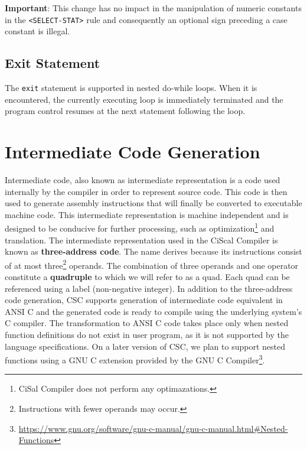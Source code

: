 \documentclass{article}
\def\code#1{\texttt{#1}} %
\begin{document}
\textbf{Important}: This change has no impact in the manipulation of numeric constants in the \code{<SELECT-STAT>}
rule and consequently an optional sign preceding a case constant is illegal.

\subsection{Exit Statement}
The \code{exit} statement is supported in nested do-while loops. When it is encountered, the currently
executing loop is immediately terminated and the program control resumes at the next statement following
the loop.

\newpage


\section{Intermediate Code Generation}
Intermediate code, also known as intermediate representation is a code used internally by the compiler
in order to represent source code. This code is then used to generate assembly instructions that will finally
be converted to executable machine code. This intermediate representation is machine independent
and is designed to be conducive for further processing, such as optimization\footnote{CiSal Compiler
does not perform any optimazations.} and translation. The intermediate representation used in the CiScal
Compiler is known as \textbf{three-address code}. The name derives because its instructions consist of
at most three\footnote{Instructions with fewer operands may occur.} operands. The combination of three
operands and one operator constitute a \textbf{quadruple} to which we will refer to as a quad. Each quad
can be referenced using a label (non-negative integer). In addition to the three-address code generation,
CSC supports generation of intermediate code equivalent in ANSI C and the generated code is ready to compile
using the underlying system's C compiler. The transformation to ANSI C code takes place only when nested
function definitions do not exist in user program, as it is not supported by the language specifications.
On a later version of CSC, we plan to support nested functions using a GNU C extension provided by the GNU
C Compiler\footnote{\url{https://www.gnu.org/software/gnu-c-manual/gnu-c-manual.html\#Nested-Functions}}.
\end{document}
